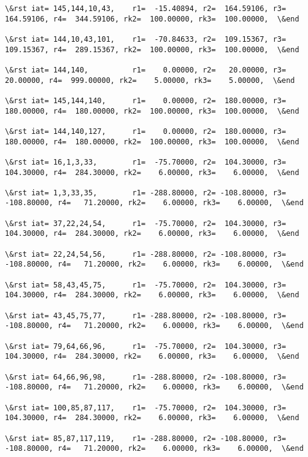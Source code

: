 \documentclass[11pt]{article}
\begin{document}
\begin{Verbatim}[commandchars=\\\{\}]
\&rst iat= 145,144,10,43,    r1=  -15.40894, r2=  164.59106, r3=  164.59106, r4=  344.59106, rk2=  100.00000, rk3=  100.00000,  \&end

\&rst iat= 144,10,43,101,    r1=  -70.84633, r2=  109.15367, r3=  109.15367, r4=  289.15367, rk2=  100.00000, rk3=  100.00000,  \&end

\&rst iat= 144,140,          r1=    0.00000, r2=   20.00000, r3=   20.00000, r4=  999.00000, rk2=    5.00000, rk3=    5.00000,  \&end

\&rst iat= 145,144,140,      r1=    0.00000, r2=  180.00000, r3=  180.00000, r4=  180.00000, rk2=  100.00000, rk3=  100.00000,  \&end

\&rst iat= 144,140,127,      r1=    0.00000, r2=  180.00000, r3=  180.00000, r4=  180.00000, rk2=  100.00000, rk3=  100.00000,  \&end

\&rst iat= 16,1,3,33,        r1=  -75.70000, r2=  104.30000, r3=  104.30000, r4=  284.30000, rk2=    6.00000, rk3=    6.00000,  \&end

\&rst iat= 1,3,33,35,        r1= -288.80000, r2= -108.80000, r3= -108.80000, r4=   71.20000, rk2=    6.00000, rk3=    6.00000,  \&end

\&rst iat= 37,22,24,54,      r1=  -75.70000, r2=  104.30000, r3=  104.30000, r4=  284.30000, rk2=    6.00000, rk3=    6.00000,  \&end

\&rst iat= 22,24,54,56,      r1= -288.80000, r2= -108.80000, r3= -108.80000, r4=   71.20000, rk2=    6.00000, rk3=    6.00000,  \&end

\&rst iat= 58,43,45,75,      r1=  -75.70000, r2=  104.30000, r3=  104.30000, r4=  284.30000, rk2=    6.00000, rk3=    6.00000,  \&end

\&rst iat= 43,45,75,77,      r1= -288.80000, r2= -108.80000, r3= -108.80000, r4=   71.20000, rk2=    6.00000, rk3=    6.00000,  \&end

\&rst iat= 79,64,66,96,      r1=  -75.70000, r2=  104.30000, r3=  104.30000, r4=  284.30000, rk2=    6.00000, rk3=    6.00000,  \&end

\&rst iat= 64,66,96,98,      r1= -288.80000, r2= -108.80000, r3= -108.80000, r4=   71.20000, rk2=    6.00000, rk3=    6.00000,  \&end

\&rst iat= 100,85,87,117,    r1=  -75.70000, r2=  104.30000, r3=  104.30000, r4=  284.30000, rk2=    6.00000, rk3=    6.00000,  \&end

\&rst iat= 85,87,117,119,    r1= -288.80000, r2= -108.80000, r3= -108.80000, r4=   71.20000, rk2=    6.00000, rk3=    6.00000,  \&end


\end{Verbatim}
\end{document}
